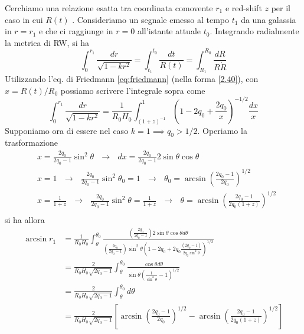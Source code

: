 Cerchiamo una relazione esatta tra coordinata comovente $r_1$ e red-shift $z$ per
il caso in cui $R(t)$ .
Consideriamo un segnale emesso al tempo $t_1$ da una galassia in $r=r_1$ e che
ci raggiunge in $r=0$ all'istante attuale $t_0$. Integrando radialmente la
metrica di RW, si ha
\begin{equation}
  \int_0^{r_1} \frac{dr}{\sqrt{1-kr^2}} = \int_{t_1}^{t_0} \frac{dt}{R(t)} =
  \int_{R_1}^{R_0} \frac{dR}{R \dot{R}}
\end{equation}
Utilizzando l'eq. di Friedmann \eqref{eq:friedmann} (nella forma \eqref{2.40}),
con $x=R(t)/R_0$ possiamo scrivere l'integrale sopra come
\begin{equation}
  \int_0^{r_1} \frac{dr}{\sqrt{1-kr^2}} = \frac{1}{R_0 H_0}
  \int_{(1+z)^{-1}}^{1} \left(1-2q_0+ \frac{2q_0}{x} \right)^{-1/2} \frac{dx}{x}
\end{equation}
Supponiamo ora di essere nel caso $k=1 \implies q_0>1/2$.  Operiamo la trasformazione
\begin{equation}
  \begin{split}
    & x= \frac{2q_0}{2q_0-1} \sin^2 \theta ~~~\rightarrow~~~ dx = \frac{2q_0}{2q_0-1} 2 \sin \theta \cos \theta \\
    & x=1 ~~~\rightarrow~~~ \frac{2q_0}{2q_0-1} \sin^2 \theta_0 =1 ~~~\rightarrow~~~
    \theta_0= \arcsin \left(\frac{2q_0-1}{2q_0}\right)^{1/2} \\
    & x= \frac{1}{1+z} ~~~\rightarrow~~~ \frac{2q_0}{2q_0-1} \sin^2 \theta= \frac{1}{1+z} ~~~\rightarrow~~~
    \theta = \arcsin \left(\frac{2q_0-1}{2q_0(1+z)}\right)^{1/2} \\
  \end{split}
  \label{posizioni_mattig}
\end{equation}
si ha allora
\begin{equation}
  \begin{split}
    \arcsin r_1 & = \frac{1}{R_0 H_0} \int_{\theta}^{\theta_0}
    \frac{ \left(\frac {2q_0}{2q_0-1}\right)  2 \sin \theta \cos \theta d\theta}
    { \left(\frac{2q_0}{2q_0-1}\right) \sin^2 \theta
      \left( 1-2q_0 + 2q_0 \frac{(2q_0-1)}{ 2q_0 \sin^2 \theta} \right)^{1/2}} \\
    & = \frac{2}{R_0 H_0 \sqrt{2q_0-1}}  \int_{\theta}^{\theta_0}
    \frac{\cos \theta d \theta}{\sin \theta \left(\frac{1}{\sin^2 \theta} -1 \right)^{1/2}} \\
    & = \frac{2}{R_0 H_0 \sqrt{2q_0-1}}  \int_{\theta}^{\theta_0} d \theta \\
    & = \frac{2}{R_0 H_0 \sqrt{2q_0-1}}
    \left[ \arcsin \left(\frac{2q_0-1}{2q_0}\right)^{1/2} -
      \arcsin \left(\frac{2q_0-1}{2q_0(1+z)}\right)^{1/2}  \right]
  \end{split}
\end{equation}
